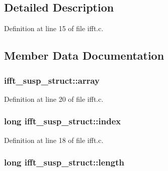 \subsection{Detailed Description}


Definition at line 15 of file ifft.\+c.



\subsection{Member Data Documentation}
\subsubsection[{\texorpdfstring{array}{array}}]{ ifft\+\_\+susp\+\_\+struct\+::array}\hypertarget{structifft__susp__struct_a8203862bee427676ae42505e4d612dff}{}\label{structifft__susp__struct_a8203862bee427676ae42505e4d612dff}


Definition at line 20 of file ifft.\+c.

\subsubsection[{\texorpdfstring{index}{index}}]{\setlength{\rightskip}{0pt plus 5cm}long ifft\+\_\+susp\+\_\+struct\+::index}\hypertarget{structifft__susp__struct_ae493e253e96a715cb894162fd1f2b6c8}{}\label{structifft__susp__struct_ae493e253e96a715cb894162fd1f2b6c8}


Definition at line 18 of file ifft.\+c.

\subsubsection[{\texorpdfstring{length}{length}}]{\setlength{\rightskip}{0pt plus 5cm}long ifft\+\_\+susp\+\_\+struct\+::length}\hypertarget{structifft__susp__struct_acb433849910b0830727500dc06ca3915}{}\label{structifft__susp__struct_acb433849910b0830727500dc06ca3915}


